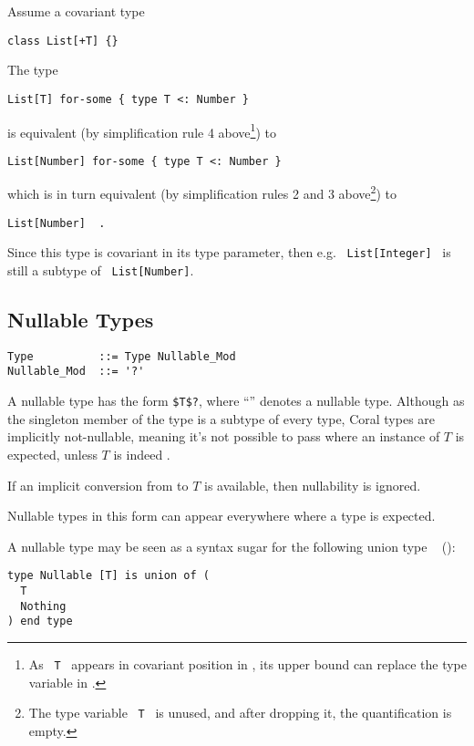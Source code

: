 \example Assume a covariant type
\begin{lstlisting}
class List[+T] {}
\end{lstlisting}

The type 
\begin{lstlisting}
List[T] for-some { type T <: Number }
\end{lstlisting}

is equivalent (by simplification rule 4 above\footnote{As ~\lstinline!T!~ appears in covariant position in , its upper bound can replace the type variable in .}) to
\begin{lstlisting}
List[Number] for-some { type T <: Number }
\end{lstlisting}

which is in turn equivalent (by simplification rules 2 and 3 above\footnote{The type variable ~\lstinline!T!~ is unused, and after dropping it, the quantification is empty.}) to
\begin{lstlisting}
List[Number]  .
\end{lstlisting}

Since this  type is covariant in its type parameter, then e.g. ~\lstinline!List[Integer]!~ is still a subtype of ~\lstinline!List[Number]!. 





\subsection{Nullable Types}
\label{sec:nullable-types}

\syntax\begin{lstlisting}
Type          ::= Type Nullable_Mod
Nullable_Mod  ::= '?'
\end{lstlisting}

A nullable type has the form \lstinline!$T$?!, where ``'' denotes a nullable type. Although  as the singleton member of the  type is a subtype of every type, Coral types are implicitly not-nullable, meaning it's not possible to pass  where an instance of $T$ is expected, unless $T$ is indeed . 

If an implicit conversion from  to $T$ is available, then nullability is ignored. 

Nullable types in this form can appear everywhere where a type is expected. 

A nullable type may be seen as a syntax sugar for the following union type ~ ():
\begin{lstlisting}
type Nullable [T] is union of (
  T
  Nothing
) end type
\end{lstlisting}






